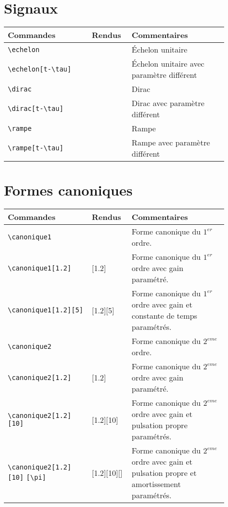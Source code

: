 \documentclass[a4paper,12pt]{article}
\begin{document}
	\section{Signaux}


	\begin{tabular}{|p{0.35\linewidth}|p{0.15\linewidth}|p{0.4\linewidth}|}
		\hline
			\textbf{Commandes}&\textbf{Rendus}&\textbf{Commentaires}
		\\\hline\hline
			\verb!\echelon!	&	\echelon	&	Échelon unitaire
		\\\hline
			\verb!\echelon[t-\tau]!	&	\echelon[t-\tau]	&	Échelon unitaire avec paramètre différent
		\\\hline
			\verb!\dirac!	&	\dirac	&	Dirac
		\\\hline
			\verb!\dirac[t-\tau]!	&	\dirac[t-\tau]	&	Dirac avec paramètre différent
		\\\hline
			\verb!\rampe!	&	\rampe	&	Rampe
		\\\hline
			\verb!\rampe[t-\tau]!	&	\rampe	&	Rampe avec paramètre différent
		\\\hline
	\end{tabular}
	

	\section{Formes canoniques}

	\begin{tabular}{|p{0.35\linewidth}|p{0.15\linewidth}|p{0.4\linewidth}|}
		\hline
			\textbf{Commandes}&\textbf{Rendus}&\textbf{Commentaires}
		\\\hline\hline
			\verb!\canonique1!	&	\canonique1 &	Forme canonique du $1^{er}$ ordre.
		\\\hline
			\verb!\canonique1[1.2]!	&	\canonique1[1.2] &	Forme canonique du $1^{er}$ ordre avec gain paramétré.
		\\\hline
			\verb!\canonique1[1.2][5]!	&	\canonique1[1.2][5] &	Forme canonique du $1^{er}$ ordre avec gain et constante de temps paramétrés.
		\\\hline
			\verb!\canonique2!	&	\canonique2 &	Forme canonique du $2^{eme}$ ordre.
		\\\hline
			\verb!\canonique2[1.2]!	&	\canonique2[1.2] &	Forme canonique du $2^{eme}$ ordre avec gain paramétré.
		\\\hline
			\verb!\canonique2[1.2][10]!	&	\canonique2[1.2][10] &	Forme canonique du $2^{eme}$ ordre avec gain et pulsation propre paramétrés.
		\\\hline
			\verb!\canonique2[1.2][10]! \verb![\pi]!	&	\canonique2[1.2][10][\pi] &	Forme canonique du $2^{eme}$ ordre avec gain et pulsation propre et amortissement paramétrés.
		\\\hline
	\end{tabular}
\end{document}
